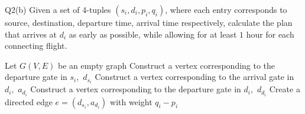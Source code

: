 \begin{problem}
  {Q2(b)}
  Given a set of 4-tuples $(s_i, d_i, p_i, q_i)$, where each entry corresponds to source, destination, departure time, arrival time respectively, calculate
  the plan that arrives at $d_i$ as early as possible, while allowing for at least $1$ hour for each connecting flight. \\
  \begin{algorithmic}[1]
    \STATE Let $G(V,E)$ be an empty graph
    \STATE Construct a vertex corresponding to the departure gate in $s_i,$ $d_{s_i}$
    \STATE Construct a vertex corresponding to the arrival gate in $d_i,$ $a_{d_i}$
    \STATE Construct a vertex corresponding to the departure gate in $d_i,$ $d_{d_i}$
    \STATE Create a directed edge $e = (d_{s_i}, a_{d_i})$ with weight $q_i - p_i$
    \ENDFOR
  \end{algorithmic}
\end{problem}
